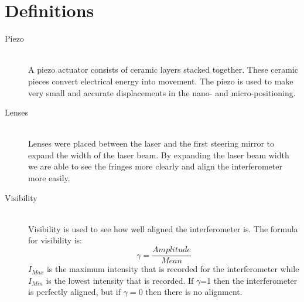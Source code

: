 \onecolumn
\section{Definitions}

\begin{description}
  \item[Piezo] \hfill \\ 
  A piezo actuator consists of ceramic layers stacked together. These ceramic pieces convert electrical energy into movement. The piezo is used to make very small and accurate displacements in the nano- and micro-positioning.
  \item[Lenses] \hfill \\ 
  Lenses were placed between the laser and the first steering mirror to expand the width of the laser beam. By expanding the laser beam width we are able to see the fringes more clearly and align the interferometer more easily.
  \item[Visibility] \hfill \\
  Visibility is used to see how well aligned the interferometer is. The formula for visibility is:
%
     \begin{equation}\label{eqn:Visibility}  
        \gamma= \frac{Amplitude}{Mean}
     \end{equation}    
%
$I_{Max}$ is the maximum intensity that is recorded for the interferometer while $I_{Min}$ is the lowest intensity that is recorded.  If $\gamma$=1 then the interferometer is perfectly aligned, but if $\gamma=0$ then there is no alignment. 
\end{description}
